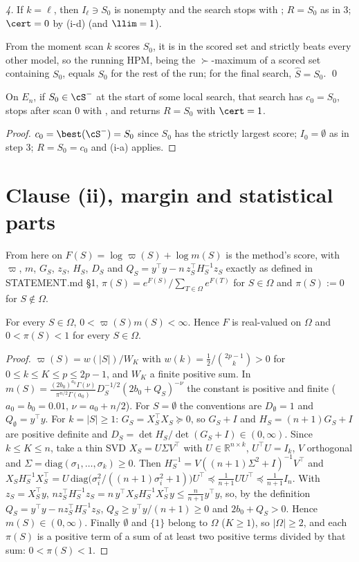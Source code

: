 \documentclass[11pt]{report}
\begin{document}
\emph{4.} If $k=\ell$, then $I_\ell\ni S_0$ is nonempty and the search stops with \LIMIT; $R=S_0$ as in 3; $\cert=0$ by (i-d) (and $\llim=1$).

From the moment scan $k$ scores $S_0$, it is in the scored set and strictly beats every other model, so the running HPM, being the $\succ$-maximum of a scored set containing $S_0$, equals $S_0$ for the rest of the run; for the final search, $\hat S=S_0$. \qed

\begin{T20corollary}\label{T20:cor:already}
On $E_n$, if $S_0\in\cS^-$ at the start of some local search, that search has $c_0=S_0$, stops after scan $0$ with \NOIMP, and returns $R=S_0$ with $\cert=1$.
\end{T20corollary}
\begin{proof}
$c_0=\best(\cS^-)=S_0$ since $S_0$ has the strictly largest score; $I_0=\emptyset$ as in step 3; $R=S_0=c_0$ and (i-a) applies.
\end{proof}

\section{Clause (ii), margin and statistical parts}

From here on $F(S)=\log\varpi(S)+\log m(S)$ is the method's score, with $\varpi$, $m$, $G_S$, $z_S$, $H_S$, $D_S$ and $Q_S=y^\top y-n\,z_S^\top H_S^{-1}z_S$ exactly as defined in STATEMENT.md \S1, $\pi(S)=e^{F(S)}/\sum_{T\in\Omega}e^{F(T)}$ for $S\in\Omega$ and $\pi(S):=0$ for $S\notin\Omega$.

\begin{T20lemma}\label{T20:lem:finite}
For every $S\in\Omega$, $0<\varpi(S)m(S)<\infty$. Hence $F$ is real-valued on $\Omega$ and $0<\pi(S)<1$ for every $S\in\Omega$.
\end{T20lemma}
\begin{proof}
$\varpi(S)=w(|S|)/W_K$ with $w(k)=\tfrac12/\binom{2p-1}{k}>0$ for $0\le k\le K\le p\le 2p-1$, and $W_K$ a finite positive sum. In $m(S)=\frac{(2b_0)^{a_0}\Gamma(\nu)}{\pi^{n/2}\Gamma(a_0)}D_S^{-1/2}(2b_0+Q_S)^{-\nu}$ the constant is positive and finite ($a_0=b_0=0.01$, $\nu=a_0+n/2$). For $S=\emptyset$ the conventions are $D_\emptyset=1$ and $Q_\emptyset=y^\top y$. For $k=|S|\ge1$: $G_S=X_S^\top X_S\succeq0$, so $G_S+I$ and $H_S=(n+1)G_S+I$ are positive definite and $D_S=\det H_S/\det(G_S+I)\in(0,\infty)$. Since $k\le K\le n$, take a thin SVD $X_S=U\Sigma V^\top$ with $U\in\mathbb{R}^{n\times k}$, $U^\top U=I_k$, $V$ orthogonal and $\Sigma=\mathrm{diag}(\sigma_1,\dots,\sigma_k)\ge0$. Then $H_S^{-1}=V((n+1)\Sigma^2+I)^{-1}V^\top$ and
$X_SH_S^{-1}X_S^\top=U\,\mathrm{diag}\big(\sigma_i^2/((n+1)\sigma_i^2+1)\big)U^\top\preceq\tfrac1{n+1}UU^\top\preceq\tfrac1{n+1}I_n$.
With $z_S=X_S^\top y$, $n z_S^\top H_S^{-1}z_S=n\,y^\top X_SH_S^{-1}X_S^\top y\le\frac{n}{n+1}y^\top y$, so, by the definition $Q_S=y^\top y-n z_S^\top H_S^{-1}z_S$, $Q_S\ge y^\top y/(n+1)\ge0$ and $2b_0+Q_S>0$. Hence $m(S)\in(0,\infty)$. Finally $\emptyset$ and $\{1\}$ belong to $\Omega$ ($K\ge1$), so $|\Omega|\ge2$, and each $\pi(S)$ is a positive term of a sum of at least two positive terms divided by that sum: $0<\pi(S)<1$.
\end{proof}
\end{document}
